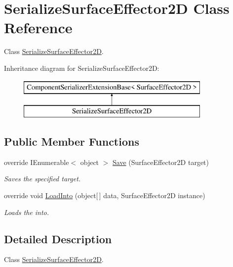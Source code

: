 \hypertarget{class_serialize_surface_effector2_d}{}\section{Serialize\+Surface\+Effector2D Class Reference}
\label{class_serialize_surface_effector2_d}


Class \hyperlink{class_serialize_surface_effector2_d}{Serialize\+Surface\+Effector2D}.  


Inheritance diagram for Serialize\+Surface\+Effector2D\+:\begin{figure}[H]
\begin{center}
\leavevmode
\includegraphics[height=2.000000cm]{class_serialize_surface_effector2_d}
\end{center}
\end{figure}
\subsection*{Public Member Functions}
\begin{DoxyCompactItemize}
\item 
override I\+Enumerable$<$ object $>$ \hyperlink{class_serialize_surface_effector2_d_a728f9886c7374a743c7316db50cda5ce}{Save} (Surface\+Effector2D target)
\begin{DoxyCompactList}\small\item\em Saves the specified target. \end{DoxyCompactList}\item 
override void \hyperlink{class_serialize_surface_effector2_d_a6f5729529ff455ccca0bd4e4956db6f9}{Load\+Into} (object\mbox{[}$\,$\mbox{]} data, Surface\+Effector2D instance)
\begin{DoxyCompactList}\small\item\em Loads the into. \end{DoxyCompactList}\end{DoxyCompactItemize}


\subsection{Detailed Description}
Class \hyperlink{class_serialize_surface_effector2_d}{Serialize\+Surface\+Effector2D}. 



